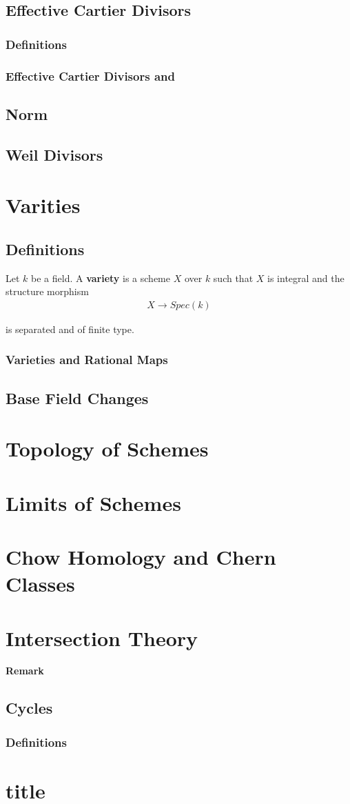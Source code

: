 \documentclass[Total.tex]{subfiles}
\begin{document}
		\section{Effective Cartier Divisors}
			\subsection{Definitions}
			\subsection{Effective Cartier Divisors and }
		\section{Norm}
		\section{Weil Divisors}
	\chapter{Varities}
		\section{Definitions}
			\begin{Def}
				Let $k$ be a field. A \textbf{variety} is a scheme $X$ over $k$ such that $X$ is integral and the structure morphism
				\begin{gather*}
					X\rightarrow Spec(k)
				\end{gather*}
				
				is separated and of finite type.
			\end{Def}
			\subsection{Varieties and Rational Maps}
		\section{Base Field Changes}
	\chapter{Topology of Schemes}
	\chapter{Limits of Schemes}
	\chapter{Chow Homology and Chern Classes}
	\chapter{Intersection Theory}
		\textbf{Remark} 
		\section{Cycles}
			\subsection{Definitions}
	\chapter{title}
\end{document}
